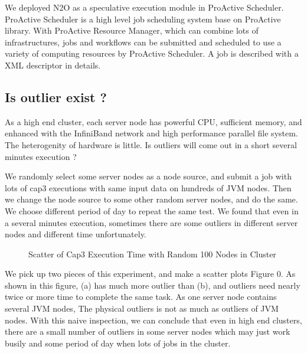  We deployed N2O as a speculative execution module in ProActive Scheduler. ProActive Scheduler is a high level job scheduling system base on ProActive library. With ProActive Resource Manager, which can combine lots of infrastructures, jobs and workflows can be submitted and scheduled to use a variety of computing resources by ProActive Scheduler. A job is described with a XML descriptor in details.

\subsection{Is outlier exist ?}

As a high end cluster, each server node has powerful CPU, sufficient memory, and enhanced with the InfiniBand network and high performance parallel file system. The heterogenity of hardware is little. Is outliers will come out in a short several minutes execution ?

We randomly select some server nodes as a node source, and submit a job with lots of cap3 executions with same input data on hundreds of JVM nodes. Then we change the node source to some other random server nodes, and do the same. We choose different period of day to repeat the same test. We found that even in a several minutes execution, sometimes there are some outliers in different server nodes and different time unfortunately.

\begin{figure}
\centering
{}
\caption{Scatter of Cap3 Execution Time with Random 100 Nodes in Cluster}
\label{figure:outlier}
\end{figure}

We pick up two pieces of this experiment, and make a scatter plots Figure 0. As shown in this figure, (a) has much more outlier than (b), and outliers need nearly twice or more time to complete the same task. As one server node contains several JVM nodes, The physical outliers is not as much as outliers of JVM nodes. With this naive inspection, we can conclude that even in high end clusters, there are a small number of outliers in some server nodes which may just work busily and some period of day when lots of jobs in the cluster.

